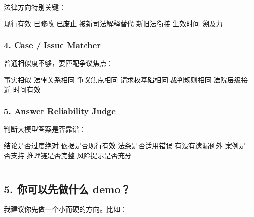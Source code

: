 \documentclass[
  12pt,
]{ctexart}
\newenvironment{Shaded}{}{}
\newcommand{\NormalTok}[1]{#1}
\begin{document}
法律方向特别关键：

\begin{Shaded}
\begin{Highlighting}[]
\NormalTok{现行有效}
\NormalTok{已修改}
\NormalTok{已废止}
\NormalTok{被新司法解释替代}
\NormalTok{新旧法衔接}
\NormalTok{生效时间}
\NormalTok{溯及力}
\end{Highlighting}
\end{Shaded}

\subsubsection{4. Case / Issue Matcher}\label{case-issue-matcher}

普通相似度不够，要匹配争议焦点：

\begin{Shaded}
\begin{Highlighting}[]
\NormalTok{事实相似}
\NormalTok{法律关系相同}
\NormalTok{争议焦点相同}
\NormalTok{请求权基础相同}
\NormalTok{裁判规则相同}
\NormalTok{法院层级接近}
\NormalTok{时间有效}
\end{Highlighting}
\end{Shaded}

\subsubsection{5. Answer Reliability
Judge}\label{answer-reliability-judge}

判断大模型答案是否靠谱：

\begin{Shaded}
\begin{Highlighting}[]
\NormalTok{结论是否过度绝对}
\NormalTok{依据是否现行有效}
\NormalTok{法条是否适用错误}
\NormalTok{有没有遗漏例外}
\NormalTok{案例是否支持}
\NormalTok{推理链是否完整}
\NormalTok{风险提示是否充分}
\end{Highlighting}
\end{Shaded}

\begin{center}\rule{0.5\linewidth}{0.5pt}\end{center}

\subsection{5. 你可以先做什么
demo？}\label{ux4f60ux53efux4ee5ux5148ux505aux4ec0ux4e48-demo}

我建议你先做一个小而硬的方向。比如：
\end{document}

